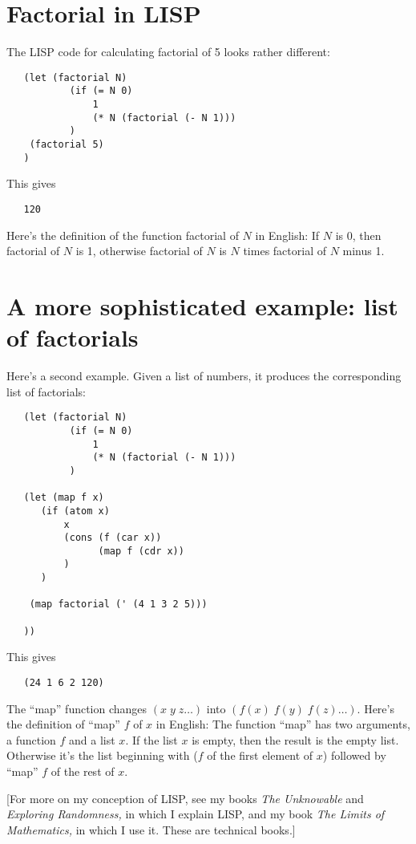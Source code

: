 \documentclass[12pt]{book}
\begin{document}
\section*{Factorial in LISP}

The LISP code for calculating factorial of 5 looks rather different:
\begin{verbatim}
   (let (factorial N) 
           (if (= N 0) 
               1 
               (* N (factorial (- N 1)))
           ) 
    (factorial 5)
   )
\end{verbatim}
This gives
\begin{verbatim}
   120
\end{verbatim}
 
Here's the definition of the function factorial of $N$ 
in English: 
If $N$ is 0, then
factorial of $N$ is 1, otherwise factorial of $N$ is $N$ times factorial of $N$ minus 1.

\section*{A more sophisticated example: list of factorials}

Here's a second example.
Given a list of numbers,
it produces the corresponding list of factorials:
\begin{verbatim}
   (let (factorial N) 
           (if (= N 0) 
               1 
               (* N (factorial (- N 1)))
           ) 

   (let (map f x)
      (if (atom x) 
          x 
          (cons (f (car x))
                (map f (cdr x))
          ) 
      ) 

    (map factorial (' (4 1 3 2 5)))

   ))
\end{verbatim}
This gives
\begin{verbatim}
   (24 1 6 2 120)
\end{verbatim}
 
The ``map'' function changes $(x \; y \; z\ldots)$ into $(f(x) \; f(y) \; f(z)\ldots)$.
Here's the definition of ``map'' $f$ of $x$
in English: The function ``map'' has two arguments, a function $f$ and a list $x$.
If the list $x$ is empty, then the result is the empty list.
Otherwise it's the list beginning with ($f$ of the
first element of $x$) followed by 
``map'' $f$ of the rest of $x$.
 
\medskip
{\footnotesize
[For more on my conception of LISP, see my books \emph{The Unknowable}
and \emph{Exploring Randomness,} in which I explain LISP, and my book
\emph{The Limits of Mathematics,} in which I use it. These are technical books.]

}
\medskip
\end{document}
